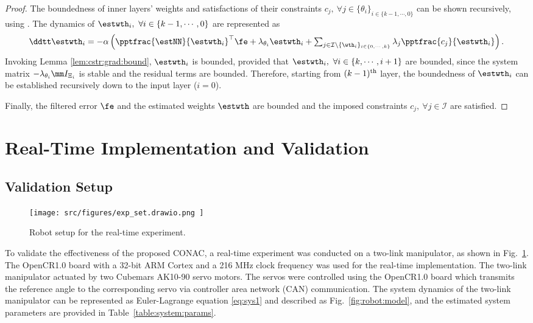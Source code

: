 \documentclass[lettersize,journal]{IEEEtran}
\begin{document}
\begin{proof}
The boundedness of inner layers' weights and satisfactions of their constraints $c_j,\ \forall j\in\{\theta_i\}_{i\in\{k-1,\cdots,0\}}$ can be shown recursively, using \cite[Chap.~4 Thm.~1.9]{Desoer:2009aa}.
The dynamics of $\estwth_i,\ \forall i\in\{k-1,\cdots,0\}$ are represented as
\begin{equation}
    \ddtt \estwth_i 
    =
    -\alpha
    \left(
        \pptfrac{\estNN}{\estwth_i}^\top
        \fe
        +
        \lambda_{\theta_i}\estwth_i
        +
        \textstyle\sum_{
            j\in\mathcal{I}\setminus \{\wth_i\}_{i\in\{0,\cdots,k\}}
        }
        \lambda_j
        \pptfrac{c_j}{\estwth_i}
    \right)
    .
\end{equation}
Invoking Lemma \ref{lem:cstr:grad:bound}, $\estwth_i$ is bounded, provided that $\estwth_i,\ \forall i\in\{k,\cdots,i+1\}$ are bounded, since the system matrix $-\lambda_{\theta_i} \mm I_{\Xi_i}$ is stable and the residual terms are bounded.
Therefore, starting from $(k-1)\textsuperscript{th}$ layer, the boundedness of $\estwth_i$ can be established recursively down to the input layer ($i=0$).

\hfill

Finally, the filtered error $\fe$ and the estimated weights $\estwth$ are bounded and the imposed constraints $c_j,\ \forall j\in\mathcal I$ are satisfied.

\end{proof}

\section{Real-Time Implementation and Validation}\label{sec:sim}

\subsection{Validation Setup}

\begin{figure}[t]
    \centering
        \texttt{[image: 
            src/figures/exp\_set.drawio.png
        ]}%
    \caption{
        Robot setup for the real-time experiment.
    }
    \label{fig:ctrl:exp:set}
\end{figure}

To validate the effectiveness of the proposed CONAC, a real-time experiment was conducted on a two-link manipulator, as shown in Fig.~\ref{fig:ctrl:exp:set}. 
The OpenCR1.0 board \cite{opencr} with a 32-bit ARM Cortex and a 216 MHz clock frequency was used for the real-time implementation.
The two-link manipulator actuated by two Cubemars AK10-90 servo motors. 
The servos were controlled using the OpenCR1.0 board which transmits the reference angle to the corresponding servo via controller area network (CAN) communication.
The system dynamics of the two-link manipulator can be represented as Euler-Lagrange equation \eqref{eq:sys1} and described as Fig.~\ref{fig:robot:model}, and the estimated system parameters are provided in Table~\ref{table:system:params}. 
\end{document}
